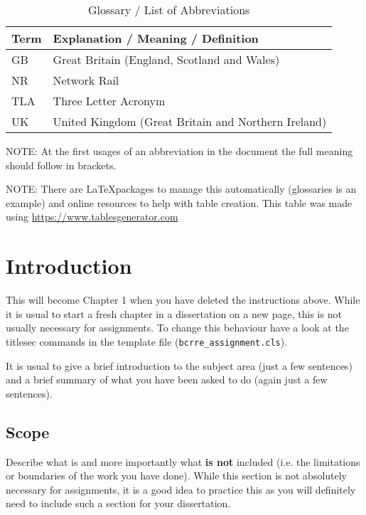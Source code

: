 \documentclass{bcrre_assignment}
\begin{document}
\begin{table}[h]
\centering
\caption{Glossary / List of Abbreviations}
\label{tab:my-table}
\begin{tabular}{@{}ll@{}}
\toprule
Term & Explanation / Meaning / Definition \\ \midrule
GB & Great Britain (England, Scotland and Wales) \\
NR & Network Rail \\
TLA & Three Letter Acronym \\
UK & United Kingdom (Great Britain and Northern Ireland) \\ \bottomrule
\end{tabular}
\end{table}

NOTE: At the first usages of an abbreviation in the document the full meaning should follow in brackets.

NOTE: There are \LaTeX packages to manage this automatically (glossaries is an example) and online resources to help with table creation. This table was made using \url{https://www.tablesgenerator.com}

\endgroup



\chapter{Introduction} 

This will become Chapter 1 when you have deleted the instructions above.  While it is usual to start a fresh chapter in a dissertation on a new page, this is not usually necessary for assignments. To change this behaviour have a look at the titlesec commands in the template file (\verb|bcrre_assignment.cls|).

It is usual to give a brief introduction to the subject area (just a few sentences) and a brief summary of what you have been asked to do (again just a few sentences).

\section{Scope}
Describe what is and more importantly what \textbf{is not} included (i.e. the limitations or boundaries of the work you have done).  While this section is not absolutely necessary for assignments, it is a good idea to practice this as you will definitely need to include such a section for your dissertation. 
\end{document}

